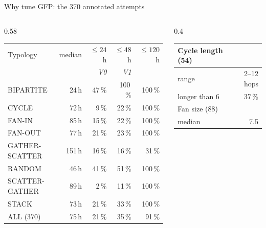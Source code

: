 \documentclass[aspectratio=169,10pt,t]{beamer}
\begin{document}
\begin{frame}{Why tune GFP: the 370 annotated attempts}
  \vspace{-1.0em}
  \begin{columns}[T]
    \begin{column}{0.58\textwidth}
      \begin{table}
        \small
        \setlength{\tabcolsep}{5pt}
        \renewcommand{\arraystretch}{0.9}
        \begin{tabular}{@{}lrrrr@{}}
          \toprule
          Typology & median & $\le 24$\,h & $\le 48$\,h & $\le 120$\,h \\
          & & \textit{V0} & \textit{V1} & \\
          \midrule
          BIPARTITE      & 24\,h  & 47\,\% & 100\,\% & 100\,\% \\
          CYCLE          & 72\,h  & 9\,\%  & 22\,\%  & 100\,\% \\
          FAN-IN         & 85\,h  & 15\,\% & 22\,\%  & 100\,\% \\
          FAN-OUT        & 77\,h  & 21\,\% & 23\,\%  & 100\,\% \\
          GATHER-SCATTER & 151\,h & 16\,\% & 16\,\%  & 31\,\%  \\
          RANDOM         & 46\,h  & 41\,\% & 51\,\%  & 100\,\% \\
          SCATTER-GATHER & 89\,h  & 2\,\%  & 11\,\%  & 100\,\% \\
          STACK          & 73\,h  & 21\,\% & 33\,\%  & 100\,\% \\
          \midrule
          ALL (370)      & 75\,h  & 21\,\% & 35\,\%  & 91\,\%  \\
          \bottomrule
        \end{tabular}
      \end{table}
    \end{column}
    \begin{column}{0.4\textwidth}
      \begin{table}
        \small
        \setlength{\tabcolsep}{5pt}
        \begin{tabular}{@{}lr@{}}
          \toprule
          Cycle length (54) & \\
          \midrule
          range & 2--12 hops \\
          longer than 6 & 37\,\% \\
          \addlinespace[3pt]
          \toprule
          Fan size (88) & \\
          \midrule
          median & 7.5 \\

\end{tabular}
\end{table}
\end{column}
\end{columns}
\end{frame}
\end{document}

